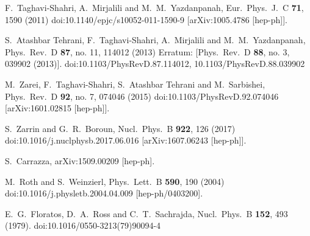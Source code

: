 \documentclass[review]{elsarticle}
\begin{document}
\begin{thebibliography}{}
  F.~Taghavi-Shahri, A.~Mirjalili and M.~M.~Yazdanpanah,
  Eur.\ Phys.\ J.\ C {\bf 71}, 1590 (2011)
  doi:10.1140/epjc/s10052-011-1590-9
  [arXiv:1005.4786 [hep-ph]].


  S.~Atashbar Tehrani, F.~Taghavi-Shahri, A.~Mirjalili and M.~M.~Yazdanpanah,
  Phys.\ Rev.\ D {\bf 87}, no. 11, 114012 (2013)
  Erratum: [Phys.\ Rev.\ D {\bf 88}, no. 3, 039902 (2013)].
  doi:10.1103/PhysRevD.87.114012, 10.1103/PhysRevD.88.039902


  M.~Zarei, F.~Taghavi-Shahri, S.~Atashbar Tehrani and M.~Sarbishei,
  Phys.\ Rev.\ D {\bf 92}, no. 7, 074046 (2015)
  doi:10.1103/PhysRevD.92.074046
  [arXiv:1601.02815 [hep-ph]].


  S.~Zarrin and G.~R.~Boroun,
  Nucl.\ Phys.\ B {\bf 922}, 126 (2017)
  doi:10.1016/j.nuclphysb.2017.06.016
  [arXiv:1607.06243 [hep-ph]].


  S.~Carrazza,
  arXiv:1509.00209 [hep-ph].


  M.~Roth and S.~Weinzierl,
  Phys.\ Lett.\ B {\bf 590}, 190 (2004)
  doi:10.1016/j.physletb.2004.04.009
  [hep-ph/0403200].


  E.~G.~Floratos, D.~A.~Ross and C.~T.~Sachrajda,
  Nucl.\ Phys.\ B {\bf 152}, 493 (1979).
  doi:10.1016/0550-3213(79)90094-4



\end{thebibliography}
\end{document}
